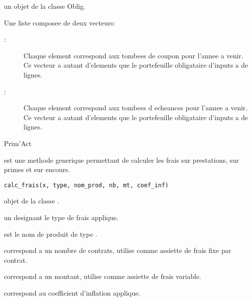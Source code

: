 \documentclass[a4paper]{book}
\begin{document}
%
\begin{Arguments}
\begin{ldescription}
\item[\code{x}] un objet de la classe Oblig.
\end{ldescription}
\end{Arguments}
%
\begin{Value}
Une liste composee de deux vecteurs:
\begin{description}

\item[ : ] Chaque element correspond aux tombees de coupon pour l'annee a venir. Ce vecteur a autant d'elements
que le portefeuille obligataire d'inputs a de lignes.
\item[ : ] Chaque element correspond aux tombees d echeances pour l'annee a venir. Ce vecteur a autant d'elements
que le portefeuille obligataire d'inputs a de lignes.

\end{description}

\end{Value}
%
\begin{Author}\relax
Prim'Act
\end{Author}
%
\begin{Description}\relax
{} est une methode generique permettant de calculer les frais sur prestations, sur primes
et sur encours.
\end{Description}
%
\begin{Usage}
\begin{verbatim}
calc_frais(x, type, nom_prod, nb, mt, coef_inf)
\end{verbatim}
\end{Usage}
%
\begin{Arguments}
\begin{ldescription}
\item[\code{x}] objet de la classe .

\item[\code{type}] un  designant le type de frais applique.

\item[\code{nom\_prod}] est le nom de produit de type .

\item[\code{nb}] correspond a un nombre de contrats, utilise comme assiette de frais fixe par contrat.

\item[\code{mt}] correspond a un montant, utilise comme assiette de frais variable.

\item[\code{coef\_inf}] correspond au coefficient d'inflation applique.
\end{ldescription}
\end{Arguments}
\end{document}
